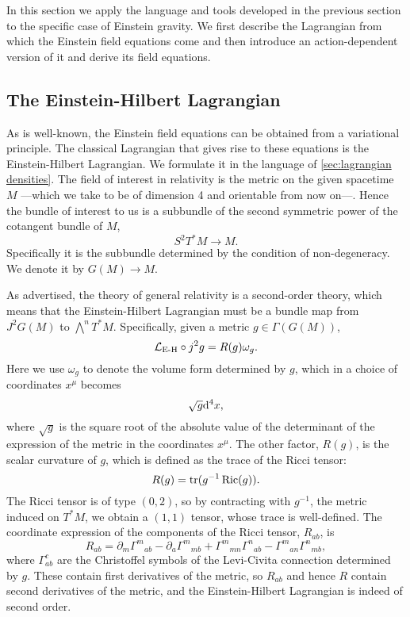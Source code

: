 \documentclass[../main.tex]{subfiles}
\begin{document}
In this section we apply the language and tools developed in the previous section to the
specific case of Einstein gravity. We first describe the Lagrangian from which the Einstein
field equations come and then introduce an action-dependent version of it and
derive its field equations. 

\subsection{The Einstein-Hilbert Lagrangian}
As is well-known, the Einstein field equations can be obtained from a variational
principle. The classical Lagrangian that gives rise to these equations is the Einstein-Hilbert
Lagrangian. We formulate it in the language of \cref{sec:lagrangian densities}. The field of interest in relativity is the metric on the given spacetime \(M\) ---which we take to be of dimension 4 and orientable from now on---. Hence the bundle of interest to us is a subbundle of the second symmetric power of the cotangent bundle of \( M\), 
\begin{equation}
    S^2 T^\ast M \to M.
\end{equation}
Specifically it is the subbundle determined by the condition of non-degeneracy. We denote it by \( G(M) \to M \).  

As advertised, the theory of general relativity is a second-order theory, which means that the Einstein-Hilbert Lagrangian must be a bundle map from \( J^2 G(M)\) to \(\bigwedge^n T^\ast M \). Specifically, given a metric \( g \in \Gamma(G(M)) \),
\begin{equation} \label{eq:EH lagrangian}
     \mathcal{L}_\text{E-H} \circ j^2 g = R(g) \omega_g.
\end{equation}
Here we use \( \omega_ g \) to denote the volume form determined by \(g\), which in a choice of coordinates  \(x^\mu\) becomes
\begin{equation}
    \sqrt{g} \mathrm{d}^4 x,
\end{equation}
where \( \sqrt{g} \) is the square root of the absolute value of the determinant of the expression of the metric in the coordinates \(x^\mu\). 
The other factor, \(R(g)\), is the scalar curvature of \(g\), which is defined as the trace of the Ricci tensor:
\begin{equation}
    R(g) = \operatorname{tr}(g^{-1} \operatorname{Ric}(g)).
\end{equation}
The Ricci tensor is of type \((0,2) \), so by contracting with \(g^{-1}\), the metric induced on \(T^\ast M\), we obtain a \((1,1)\) tensor, whose trace is well-defined. The coordinate expression of the components of the Ricci tensor, \(R_{ab}\), is
\begin{equation} \label{eq:ricci tensor}
	R_{ab} = \partial_m{\Gamma^m}_{ab} - \partial_a {\Gamma^m}_{mb} + {\Gamma^m}_{mn}
	{\Gamma^n}_{ab} - {\Gamma^m}_{an}{\Gamma^n}_{mb},
\end{equation}
where \( \Gamma_{ab}^c \) are the Christoffel symbols of the Levi-Civita connection determined by \(g\). These contain first derivatives of the metric, so \( R_{ab} \) and
hence \( R \) contain second derivatives of the metric, and the Einstein-Hilbert Lagrangian is indeed of second order.
\end{document}
